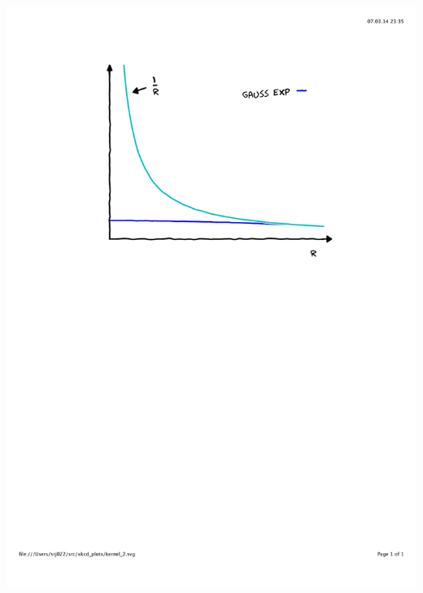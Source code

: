 \begin{frame}
\begin{columns}
\begin{column}{.50\textwidth}
{        \includegraphics[scale=0.4, clip, viewport = 110 450 490 800]
            {figures/kernel_2.pdf}}
\end{column}
\end{columns}
\end{frame}
